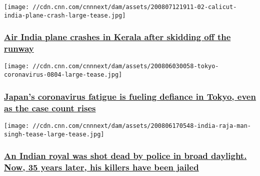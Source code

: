 \href{/2020/08/07/asia/plane-crash-calicut-india-intl/index.html}{}

\texttt{[image: //cdn.cnn.com/cnnnext/dam/assets/200807121911-02-calicut-india-plane-crash-large-tease.jpg]}

\hypertarget{air-india-plane-crashes-in-kerala-after-skidding-off-the-runway}{%
\subsubsection{\texorpdfstring{\href{/2020/08/07/asia/plane-crash-calicut-india-intl/index.html}{Air
India plane crashes in Kerala after skidding off the
runway}}{Air India plane crashes in Kerala after skidding off the runway}}\label{air-india-plane-crashes-in-kerala-after-skidding-off-the-runway}}

\href{/2020/08/07/asia/tokyo-coronavirus-fatigue-intl-hnk/index.html}{}

\texttt{[image: //cdn.cnn.com/cnnnext/dam/assets/200806030058-tokyo-coronavirus-0804-large-tease.jpg]}

\hypertarget{japans-coronavirus-fatigue-is-fueling-defiance-in-tokyo-even-as-the-case-count-rises}{%
\subsubsection{\texorpdfstring{\href{/2020/08/07/asia/tokyo-coronavirus-fatigue-intl-hnk/index.html}{Japan's
coronavirus fatigue is fueling defiance in Tokyo, even as the case count
rises}}{Japan's coronavirus fatigue is fueling defiance in Tokyo, even as the case count rises}}\label{japans-coronavirus-fatigue-is-fueling-defiance-in-tokyo-even-as-the-case-count-rises}}

\href{/2020/08/07/asia/india-maharaja-police-sentence-intl-dst-hnk/index.html}{}

\texttt{[image: //cdn.cnn.com/cnnnext/dam/assets/200806170548-india-raja-man-singh-tease-large-tease.jpg]}

\hypertarget{an-indian-royal-was-shot-dead-by-police-in-broad-daylight-now-35-years-later-his-killers-have-been-jailed}{%
\subsubsection{\texorpdfstring{\href{/2020/08/07/asia/india-maharaja-police-sentence-intl-dst-hnk/index.html}{An
Indian royal was shot dead by police in broad daylight. Now, 35 years
later, his killers have been
jailed}}{An Indian royal was shot dead by police in broad daylight. Now, 35 years later, his killers have been jailed}}\label{an-indian-royal-was-shot-dead-by-police-in-broad-daylight-now-35-years-later-his-killers-have-been-jailed}}

